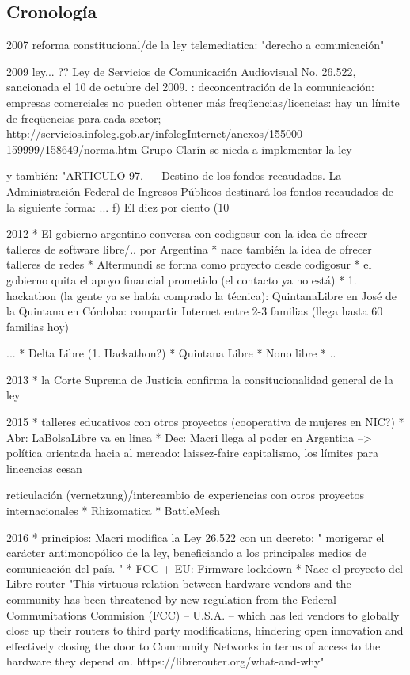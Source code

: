 \subsection{Cronología}

2007 reforma constitucional/de la ley telemediatica: "derecho a comunicación"

2009 ley... ??  Ley de Servicios 
de Comunicación Audiovisual No. 26.522, sancionada el 10 de octubre del 2009.  : deconcentración de la comunicación: empresas comerciales no pueden obtener más freqüencias/licencias: hay un límite de freqüencias para cada sector;
http://servicios.infoleg.gob.ar/infolegInternet/anexos/155000-159999/158649/norma.htm
Grupo Clarín se nieda a implementar la ley

y también:
"ARTICULO 97. — Destino de los fondos recaudados. La Administración Federal de Ingresos Públicos destinará los fondos recaudados de la siguiente forma:
...
f) El diez por ciento (10%

2012
* El gobierno argentino conversa con codigosur con la idea de ofrecer talleres de software libre/.. por Argentina
* nace también la idea de ofrecer talleres de redes
* Altermundi se forma como proyecto desde codigosur
* el gobierno quita el apoyo financial prometido (el contacto ya no está)
* 1. hackathon (la gente ya se había comprado la técnica): QuintanaLibre en José de la Quintana en Córdoba: compartir Internet entre 2-3 familias (llega hasta 60 familias hoy)

...
* Delta Libre (1. Hackathon?)
* Quintana Libre
* Nono libre
* ..

2013
* la Corte Suprema de Justicia confirma la consitucionalidad general de la ley

2015
* talleres educativos con otros proyectos (cooperativa de mujeres en NIC?)
* Abr: LaBolsaLibre va en linea
* Dec: Macri llega al poder en Argentina --> política orientada hacia al mercado: laissez-faire capitalismo, los límites para lincencias cesan


reticulación (vernetzung)/intercambio de experiencias con otros proyectos internacionales
* Rhizomatica
* BattleMesh



2016
* principios: Macri modifica la Ley 26.522 con un decreto: " morigerar el carácter antimonopólico de la ley, beneficiando a los principales medios de comunicación del país. "
* FCC + EU: Firmware lockdown
* Nace el proyecto del Libre router
"This virtuous relation between hardware vendors and the community has been threatened by new regulation from the Federal Communitations Commision (FCC) – U.S.A. – which has led vendors to globally close up their routers to third party modifications, hindering open innovation and effectively closing the door to Community Networks in terms of access to the hardware they depend on. https://librerouter.org/what-and-why"


